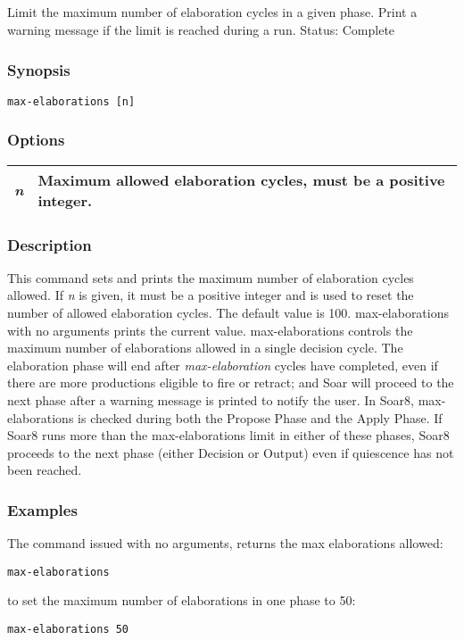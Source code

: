 \subsection{}
\label{max-elaborations}
Limit the maximum number of elaboration cycles in a given phase. Print a warning message if the limit is reached during a run. 
 Status: Complete
\subsubsection*{Synopsis}
\begin{verbatim}
max-elaborations [n]
\end{verbatim}
\subsubsection*{Options}
\begin{tabular}{|l|l|}
\hline 
\emph{n}
 & Maximum allowed elaboration cycles, must be a positive integer.  \\
 \hline 
\end{tabular}
\subsubsection*{Description}
 This command sets and prints the maximum number of elaboration cycles allowed. If \emph{n}
 is given, it must be a positive integer and is used to reset the number of allowed elaboration cycles. The default value is 100. max-elaborations with no arguments prints the current value. 
 max-elaborations controls the maximum number of elaborations allowed in a single decision cycle. The elaboration phase will end after \emph{max-elaboration}
 cycles have completed, even if there are more productions eligible to fire or retract; and Soar will proceed to the next phase after a warning message is printed to notify the user. 
 In Soar8, max-elaborations is checked during both the Propose Phase and the Apply Phase. If Soar8 runs more than the max-elaborations limit in either of these phases, Soar8 proceeds to the next phase (either Decision or Output) even if quiescence has not been reached. 
\subsubsection*{Examples}
 The command issued with no arguments, returns the max elaborations allowed: \begin{verbatim}
max-elaborations 
\end{verbatim}
 to set the maximum number of elaborations in one phase to 50: \begin{verbatim}
max-elaborations 50
\end{verbatim}
